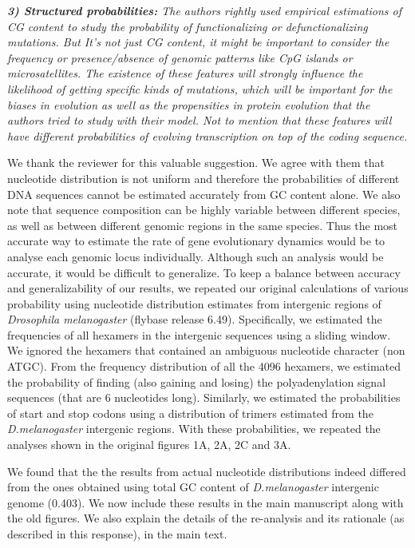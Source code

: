 \documentclass[12pt,a4paper]{article}
\begin{document}
\vspace{\baselineskip}

{\itshape \textbf{3) Structured probabilities:} The authors rightly used empirical estimations of CG content to study the probability of functionalizing or defunctionalizing mutations. But It's not just CG content, it might be important to consider the frequency or presence/absence of genomic patterns like CpG islands or microsatellites. The existence of these features will strongly influence the likelihood of getting specific kinds of mutations, which will be important for the biases in evolution as well as the propensities in protein evolution that the authors tried to study with their model. Not to mention that these features will have different probabilities of evolving transcription on top of the coding sequence.}

\vspace{\baselineskip}

We thank the reviewer for this valuable suggestion. We agree with them that nucleotide distribution is not uniform and therefore the probabilities of different DNA sequences cannot be estimated accurately from GC content alone. We also note that sequence composition can be highly variable between different species, as well as between different genomic regions in the same species. Thus the most accurate way to estimate the rate of gene evolutionary dynamics would be to analyse each genomic locus individually. Although such an analysis would be accurate, it would be difficult to generalize. To keep a balance between accuracy and generalizability of our results, we repeated our original calculations of various probability using nucleotide distribution estimates from intergenic regions of \textit{Drosophila melanogaster}  (flybase release 6.49). Specifically, we estimated the frequencies of all hexamers in the intergenic sequences using a sliding window. We ignored the hexamers that contained an ambiguous nucleotide character (non ATGC). From the frequency distribution of all the 4096 hexamers, we estimated the probability of finding (also gaining and losing) the polyadenylation signal sequences (that are 6 nucleotides long). Similarly, we estimated the probabilities of start and stop codons using a distribution of trimers estimated from the \textit{D.melanogaster} intergenic regions. With these probabilities, we repeated the analyses shown in the original figures 1A, 2A, 2C and 3A. 

We found that the the results from actual nucleotide distributions indeed differed from the ones obtained using total GC content of \textit{D.melanogaster} intergenic genome (0.403). We now include these results in the main manuscript along with the old figures. We also explain the details of the re-analysis and its rationale (as described in this response), in the main text.
\end{document}
